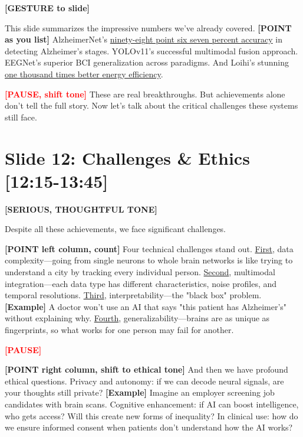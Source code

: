 \documentclass[12pt]{article}
\begin{document}
\textcolor{DukeBlue}{\textbf{[GESTURE to slide]}}

This slide summarizes the impressive numbers we've already covered. \textcolor{DukeBlue}{\textbf{[POINT as you list]}} AlzheimerNet's \ul{ninety-eight point six seven percent accuracy} in detecting Alzheimer's stages. YOLOv11's successful multimodal fusion approach. EEGNet's superior BCI generalization across paradigms. And Loihi's stunning \ul{one thousand times better energy efficiency}.

\textcolor{red}{\textbf{[PAUSE, shift tone]}} These are real breakthroughs. But achievements alone don't tell the full story. Now let's talk about the critical challenges these systems still face.

\hrulefill

\section*{Slide 12: Challenges \& Ethics [12:15-13:45]}

\textcolor{DukeBlue}{\textbf{[SERIOUS, THOUGHTFUL TONE]}}

Despite all these achievements, we face significant challenges.

\textcolor{DukeBlue}{\textbf{[POINT left column, count]}} Four technical challenges stand out. \ul{First}, data complexity—going from single neurons to whole brain networks is like trying to understand a city by tracking every individual person. \ul{Second}, multimodal integration—each data type has different characteristics, noise profiles, and temporal resolutions. \ul{Third}, interpretability—the "black box" problem. \textcolor{green!60!black}{\textbf{[Example]}} A doctor won't use an AI that says "this patient has Alzheimer's" without explaining why. \ul{Fourth}, generalizability—brains are as unique as fingerprints, so what works for one person may fail for another.

\textcolor{red}{\textbf{[PAUSE]}}

\textcolor{DukeBlue}{\textbf{[POINT right column, shift to ethical tone]}} And then we have profound ethical questions. Privacy and autonomy: if we can decode neural signals, are your thoughts still private? \textcolor{green!60!black}{\textbf{[Example]}} Imagine an employer screening job candidates with brain scans. Cognitive enhancement: if AI can boost intelligence, who gets access? Will this create new forms of inequality? In clinical use: how do we ensure informed consent when patients don't understand how the AI works?
\end{document}
